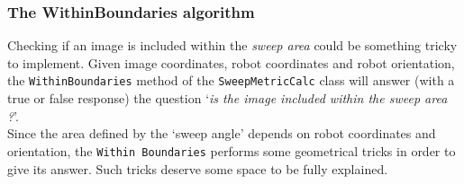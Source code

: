 \subsubsection{The WithinBoundaries algorithm}
\label{concr:iimageselector:spacial_metric_algorithm:withinboundaries}

Checking if an image is included within the \textit{sweep area}
could be something tricky to implement. Given image coordinates, 
robot coordinates and robot orientation, the \texttt{WithinBoundaries} 
method of the \texttt{SweepMetricCalc} class 
will answer (with a true or false response) the question
`\textit{is the image included within the sweep area ?}'.
\\
Since the area defined by the `sweep angle' depends on robot 
coordinates and orientation, the \texttt{Within Boundaries}
performs some geometrical tricks in order to give its answer. 
Such tricks deserve some space to be fully explained.

